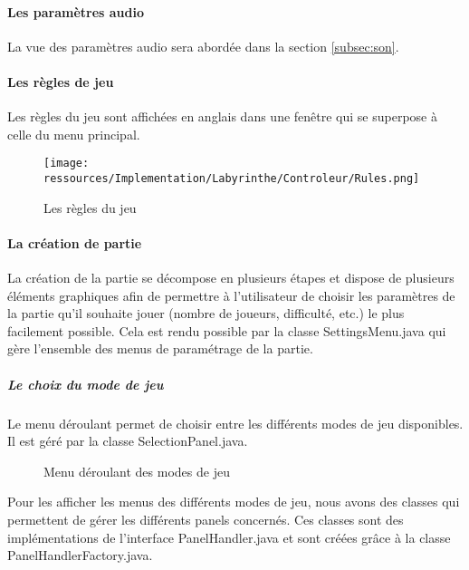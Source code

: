 \paragraph{Les paramètres audio}

La vue des paramètres audio sera abordée dans la section \ref{subsec:son}.

\paragraph{Les règles de jeu}

Les règles du jeu sont affichées en anglais dans une fenêtre qui se superpose à celle du menu principal.

\begin{figure}[h!]
    \centering
    \texttt{[image: ressources/Implementation/Labyrinthe/Controleur/Rules.png]}%
    \caption{Les règles du jeu}
    \label{fig:Rules}
\end{figure}

\paragraph{La création de partie}

La création de la partie se décompose en plusieurs étapes et dispose de plusieurs éléments graphiques afin de permettre à l'utilisateur de choisir les paramètres de la partie qu'il souhaite jouer (nombre de joueurs, difficulté, etc.) le plus facilement possible. Cela est rendu possible par la classe SettingsMenu.java qui gère l'ensemble des menus de paramétrage de la partie.

\subparagraph*{Le choix du mode de jeu}

Le menu déroulant permet de choisir entre les différents modes de jeu disponibles. Il est géré par la classe SelectionPanel.java.

\begin{figure}
    \centering
    \caption{Menu déroulant des modes de jeu}
    \label{fig:ModeSelection}
\end{figure}

Pour les afficher les menus des différents modes de jeu, nous avons des classes qui permettent de gérer les différents panels concernés. Ces classes sont des implémentations de l'interface PanelHandler.java et sont créées grâce à la classe PanelHandlerFactory.java.

